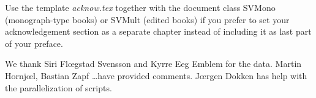 %
%


Use the template \emph{acknow.tex} together with the document class SVMono (monograph-type books) or SVMult (edited books) if you prefer to set your acknowledgement section as a separate chapter instead of including it as last part of your preface.


We thank Siri Fl\oe gstad Svensson and Kyrre Eeg Emblem for the data. Martin Hornj\oe l, Bastian Zapf \ldots have provided comments.  
J\oe rgen Dokken has help with the parallelization of scripts. 


